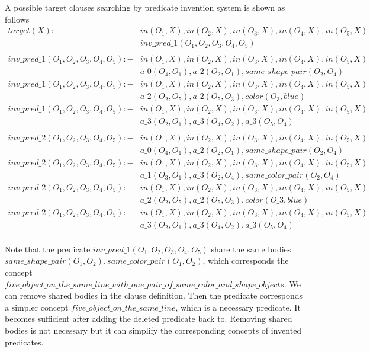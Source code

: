 \documentclass[
]{ceurart}
\begin{document}
A possible target clauses searching by predicate invention system is shown as follows
\begin{align*}
	target(X) :- & in(O_1,X),in(O_2,X),in(O_3,X),in(O_4,X),in(O_5,X) \\
						& inv\_pred\_1(O_1,O_2,O_3,O_4,O_5)\\
			 			\\
		inv\_pred\_1(O_1,O_2,O_3,O_4,O_5) :- 	& in(O_1,X),in(O_2,X),in(O_3,X),in(O_4,X),in(O_5,X) \\
																				& a\_0(O_4,O_1),a\_2(O_2,O_1), same\_shape\_pair(O_2,O_4)\\
	inv\_pred\_1(O_1,O_2,O_3,O_4,O_5) :- 	& in(O_1,X),in(O_2,X),in(O_3,X),in(O_4,X),in(O_5,X) \\
																			& a\_2(O_2,O_5),a\_2(O_5,O_3),color(O_3, blue)\\
	inv\_pred\_1(O_1,O_2,O_3,O_4,O_5) :- 	& in(O_1,X),in(O_2,X),in(O_3,X),in(O_4,X),in(O_5,X) \\
																			& a\_3(O_2,O_1),a\_3(O_4,O_2),a\_3(O_5,O_4)\\
																			\\
	inv\_pred\_2(O_1,O_2,O_3,O_4,O_5) :- 	& in(O_1,X),in(O_2,X),in(O_3,X),in(O_4,X),in(O_5,X) \\
																			& a\_0(O_4,O_1),a\_2(O_2,O_1),same\_shape\_pair(O_2,O_4)\\
	inv\_pred\_2(O_1,O_2,O_3,O_4,O_5) :- 	& in(O_1,X),in(O_2,X),in(O_3,X),in(O_4,X),in(O_5,X) \\
																			& a\_1(O_3,O_1),a\_3(O_2,O_4),same\_color\_pair(O_2,O_4)\\																			
	inv\_pred\_2(O_1,O_2,O_3,O_4,O_5) :- 	& in(O_1,X),in(O_2,X),in(O_3,X),in(O_4,X),in(O_5,X) \\
																			& a\_2(O_2,O_5),a\_2(O_5,O_3),color(O\_3, blue)\\
	inv\_pred\_2(O_1,O_2,O_3,O_4,O_5) :- 	& in(O_1,X),in(O_2,X),in(O_3,X),in(O_4,X),in(O_5,X) \\
																			& a\_3(O_2,O_1),a\_3(O_4,O_2),a\_3(O_5,O_4)\\																			
\end{align*}

Note that the predicate $ inv\_pred\_1(O_1,O_2,O_3,O_4,O_5) $ share the same bodies $ same\_shape\_pair(O_1,O_2), same\_color\_pair(O_1,O_2) $, which corresponds the concept $ five\_object\_on\_the\_same\_line\_with\_one\_pair\_of\_same\_color\_and\_shape\_objects $. We can remove shared bodies in the clause definition. Then the predicate corresponds a simpler concept $ five\_object\_on\_the\_same\_line $, which is a necessary predicate. It becomes sufficient after adding the deleted predicate back to. Removing shared bodies is not necessary but it can simplify the corresponding concepts of invented predicates. 
 
\end{document}
